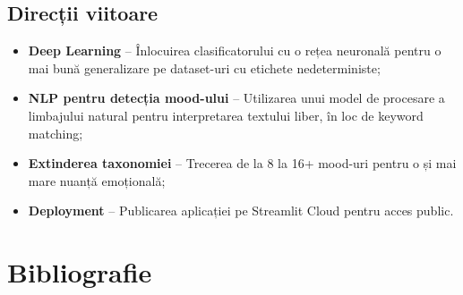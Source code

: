 \documentclass[12pt,a4paper]{article}
\begin{document}
\subsection{Direcții viitoare}

\begin{itemize}
    \item \textbf{Deep Learning} -- Înlocuirea clasificatorului cu o rețea neuronală pentru o mai bună generalizare pe dataset-uri cu etichete nedeterministe;
    \item \textbf{NLP pentru detecția mood-ului} -- Utilizarea unui model de procesare a limbajului natural pentru interpretarea textului liber, în loc de keyword matching;
    \item \textbf{Extinderea taxonomiei} -- Trecerea de la 8 la 16+ mood-uri pentru o și mai mare nuanță emoțională;
    \item \textbf{Deployment} -- Publicarea aplicației pe Streamlit Cloud pentru acces public.
\end{itemize}


\section{Bibliografie}
\end{document}
